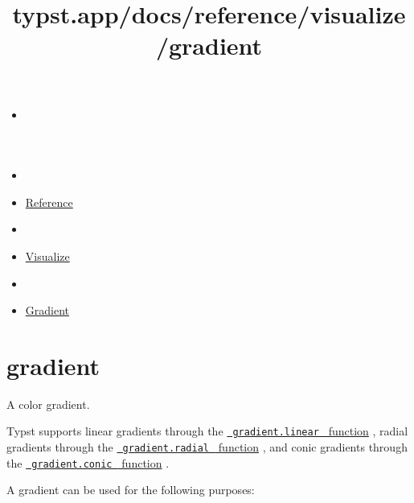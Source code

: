 \title{typst.app/docs/reference/visualize/gradient}

\begin{itemize}
\tightlist
\item
  \href{/docs}{}
\item
  
\item
  \href{/docs/reference/}{Reference}
\item
  
\item
  \href{/docs/reference/visualize/}{Visualize}
\item
  
\item
  \href{/docs/reference/visualize/gradient/}{Gradient}
\end{itemize}

\section{\texorpdfstring{{ gradient }}{ gradient }}\label{summary}

A color gradient.

Typst supports linear gradients through the
\href{/docs/reference/visualize/gradient/\#definitions-linear}{\texttt{\ gradient.linear\ }
function} , radial gradients through the
\href{/docs/reference/visualize/gradient/\#definitions-radial}{\texttt{\ gradient.radial\ }
function} , and conic gradients through the
\href{/docs/reference/visualize/gradient/\#definitions-conic}{\texttt{\ gradient.conic\ }
function} .

A gradient can be used for the following purposes:

